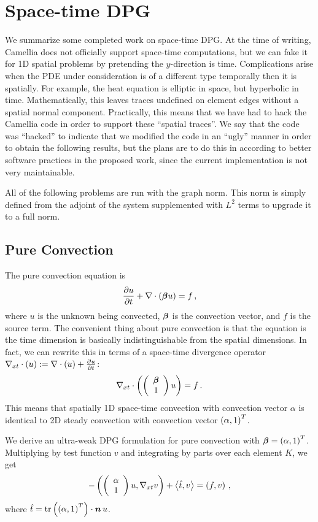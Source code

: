 \documentclass[Proposal.tex]{subfiles}
\begin{document}
\chapter{Space-time DPG}
We summarize some completed work on space-time DPG. At the time of writing, Camellia does not officially support space-time computations, but we can fake it for 1D spatial problems by pretending the $y$-direction is time.
Complications arise when the PDE under consideration is of a different type temporally then it is spatially. 
For example, the heat equation is elliptic in space, but hyperbolic in time. 
Mathematically, this leaves traces undefined on element edges without a spatial normal component. 
Practically, this means that we have had to hack the Camellia code in order to support these ``spatial traces''.
We say that the code was ``hacked'' to indicate that we modified the code in an ``ugly'' manner in order to obtain the following results, 
but the plans are to do this in according to better software practices in the proposed work, since the current implementation is not very maintainable.

All of the following problems are run with the graph norm. 
This norm is simply defined from the adjoint of the system supplemented with $L^2$ terms to upgrade it to a full norm.

\section{Pure Convection}
The pure convection equation is 
\begin{equation}
\frac{\partial u}{\partial t}+\nabla\cdot(\boldsymbol\beta u)=f\,,
\end{equation}
where $u$ is the unknown being convected, $\boldsymbol\beta$ is the convection vector, and $f$ is the source term.
The convenient thing about pure convection is that the equation is the time dimension is basically indistinguishable from the spatial dimensions. 
In fact, we can rewrite this in terms of a space-time divergence operator $\nabla_{xt}\cdot(u):=\nabla\cdot(u)+\frac{\partial u}{\partial t}$:
\[
\nabla_{xt}\cdot\left( \left( \begin{array}{c} \boldsymbol\beta\\ 1\\ \end{array} \right)u \right)=f\,.
\]
This means that spatially 1D space-time convection with convection vector $\alpha$ is identical to 2D steady convection with convection vector $\left( \alpha,1 \right)^T$.

We derive an ultra-weak DPG formulation for pure convection with $\boldsymbol\beta=\left( \alpha,1 \right)^T$. 
Multiplying by test function $v$ and integrating by parts over each element $K$, we get
\begin{equation}
-\left( \left( \begin{array}{c} \alpha\\ 1\\ \end{array} \right)u,\nabla_{xt} v \right)+\left\langle \hat t, v \right\rangle=\left( f,v \right)\,,
\end{equation}
where $\hat t=\operatorname*{tr}\left( \left( \alpha,1 \right)^T \right)\cdot\boldsymbol n\,u$.
\end{document}

